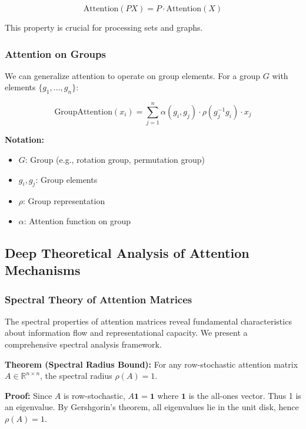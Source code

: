 \documentclass[11pt]{article}
\begin{document}
\begin{equation}
\text{Attention}(PX) = P \cdot \text{Attention}(X)
\end{equation}

This property is crucial for processing sets and graphs.

\subsubsection{Attention on Groups}

We can generalize attention to operate on group elements. For a group $G$ with elements $\{g_1, \ldots, g_n\}$:

\begin{equation}
\text{GroupAttention}(x_i) = \sum_{j=1}^{n} \alpha(g_i, g_j) \cdot \rho(g_j^{-1} g_i) \cdot x_j
\end{equation}

\begin{notationbox}
\textbf{Notation:}
\begin{itemize}
    \item $G$: Group (e.g., rotation group, permutation group)
    \item $g_i, g_j$: Group elements
    \item $\rho$: Group representation
    \item $\alpha$: Attention function on group
\end{itemize}
\end{notationbox}

\subsection{Deep Theoretical Analysis of Attention Mechanisms}

\subsubsection{Spectral Theory of Attention Matrices}

The spectral properties of attention matrices reveal fundamental characteristics about information flow and representational capacity. We present a comprehensive spectral analysis framework.

\textbf{Theorem (Spectral Radius Bound):} For any row-stochastic attention matrix $A \in \mathbb{R}^{n \times n}$, the spectral radius $\rho(A) = 1$.

\textbf{Proof:} Since $A$ is row-stochastic, $A\mathbf{1} = \mathbf{1}$ where $\mathbf{1}$ is the all-ones vector. Thus 1 is an eigenvalue. By Gershgorin's theorem, all eigenvalues lie in the unit disk, hence $\rho(A) = 1$.
\end{document}
